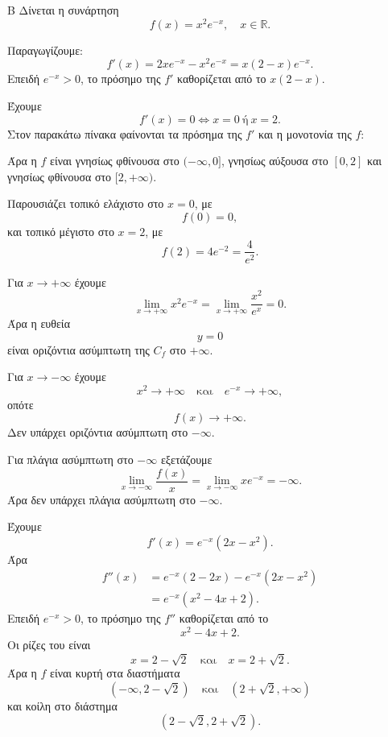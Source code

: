 \begin{thema}{Β}
Δίνεται η συνάρτηση
\[
f(x)=x^2e^{-x},\quad x\in\mathbb{R}.
\]
\begin{erwthma}
\item Παραγωγίζουμε:
\[
f'(x)=2xe^{-x}-x^2e^{-x}
=x(2-x)e^{-x}.
\]
Επειδή $e^{-x}>0$, το πρόσημο της $f'$ καθορίζεται από το $x(2-x)$.

Έχουμε
\[
f'(x)=0\Leftrightarrow x=0\ \text{ή}\ x=2.
\]
Στον παρακάτω πίνακα φαίνονται τα πρόσημα της $f'$ και η μονοτονία της $f$:
\begin{center}
\end{center}

Άρα η $f$ είναι γνησίως φθίνουσα στο $(-\infty,0]$, γνησίως αύξουσα στο $[0,2]$ και γνησίως φθίνουσα στο $[2,+\infty)$.

Παρουσιάζει τοπικό ελάχιστο στο $x=0$, με
\[
f(0)=0,
\]
και τοπικό μέγιστο στο $x=2$, με
\[
f(2)=4e^{-2}=\frac{4}{e^2}.
\]

\item Για $x\to+\infty$ έχουμε
\[
\lim_{x\to+\infty}x^2e^{-x}
=\lim_{x\to+\infty}\frac{x^2}{e^x}=0.
\]
Άρα η ευθεία
\[
{y=0}
\]
είναι οριζόντια ασύμπτωτη της $C_f$ στο $+\infty$.

Για $x\to-\infty$ έχουμε
\[
x^2\to+\infty
\quad\text{και}\quad
e^{-x}\to+\infty,
\]
οπότε
\[
f(x)\to+\infty.
\]
Δεν υπάρχει οριζόντια ασύμπτωτη στο $-\infty$.

Για πλάγια ασύμπτωτη στο $-\infty$ εξετάζουμε
\[
\lim_{x\to-\infty}\frac{f(x)}{x}
=\lim_{x\to-\infty}xe^{-x}
=-\infty.
\]
Άρα δεν υπάρχει πλάγια ασύμπτωτη στο $-\infty$.

\item Έχουμε
\[
f'(x)=e^{-x}(2x-x^2).
\]
Άρα
\begin{align*}
f''(x)
&=e^{-x}(2-2x)-e^{-x}(2x-x^2)\\
&=e^{-x}(x^2-4x+2).
\end{align*}
Επειδή $e^{-x}>0$, το πρόσημο της $f''$ καθορίζεται από το
\[
x^2-4x+2.
\]
Οι ρίζες του είναι
\[
x=2-\sqrt2
\quad\text{και}\quad
x=2+\sqrt2.
\]
Άρα η $f$ είναι κυρτή στα διαστήματα
\[
(-\infty,2-\sqrt2)
\quad\text{και}\quad
(2+\sqrt2,+\infty)
\]
και κοίλη στο διάστημα
\[
(2-\sqrt2,2+\sqrt2).
\]


\end{erwthma}
\end{thema}
